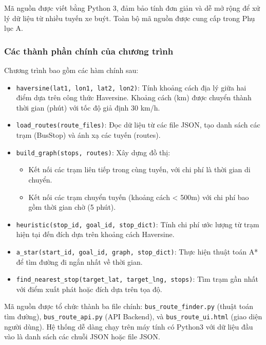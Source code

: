 \documentclass[a4paper,12pt]{article}
\begin{document}
Mã nguồn được viết bằng Python 3, đảm bảo tính đơn giản và dễ mở rộng để xử lý dữ liệu từ nhiều tuyến xe buýt. Toàn bộ mã nguồn được cung cấp trong Phụ lục A.

\subsubsection{Các thành phần chính của chương trình}

Chương trình bao gồm các hàm chính sau:

\begin{itemize}
    \item \texttt{haversine(lat1, lon1, lat2, lon2)}: Tính khoảng cách địa lý giữa hai điểm dựa trên công thức Haversine. Khoảng cách (km) được chuyển thành thời gian (phút) với tốc độ giả định 30 km/h.
    
    \item \texttt{load\_routes(route\_files)}: Đọc dữ liệu từ các file JSON, tạo danh sách các trạm (BusStop) và ánh xạ các tuyến (routes).
    
    \item \texttt{build\_graph(stops, routes)}: Xây dựng đồ thị:
    \begin{itemize}
        \item Kết nối các trạm liên tiếp trong cùng tuyến, với chi phí là thời gian di chuyển.
        \item Kết nối các trạm chuyển tuyến (khoảng cách < 500m) với chi phí bao gồm thời gian chờ (5 phút).
    \end{itemize}
    
    \item \texttt{heuristic(stop\_id, goal\_id, stop\_dict)}: Tính chi phí ước lượng từ trạm hiện tại đến đích dựa trên khoảng cách Haversine.
    
    \item \texttt{a\_star(start\_id, goal\_id, graph, stop\_dict)}: Thực hiện thuật toán A* để tìm đường đi ngắn nhất về thời gian.
    
    \item \texttt{find\_nearest\_stop(target\_lat, target\_lng, stops)}: Tìm trạm gần nhất với điểm xuất phát hoặc đích dựa trên tọa độ.
\end{itemize}

Mã nguồn được tổ chức thành ba file chính: \texttt{bus\_route\_finder.py} (thuật toán tìm đường), \texttt{bus\_route\_api.py} (API Backend), và \texttt{bus\_route\_ui.html} (giao diện người dùng). Hệ thống dễ dàng chạy trên máy tính có Python3 với dữ liệu đầu vào là danh sách các chuỗi JSON hoặc file JSON.
\end{document}
